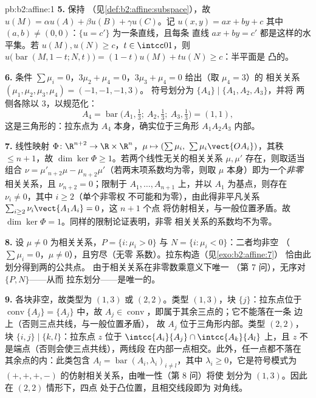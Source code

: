 \begin{solution}{pb:b2:affine:1}
\textbf{5.} 保持
（见\cref{def:b2:affine:subspace}），故 $u(M) = \alpha u(A) +
\beta u(B) + \gamma u(C)$。记 $u(x, y) = ax + by + c$
其中 $(a, b) \neq (0,0)$：$\{u = c'\}$ 为一条直线，且每条
直线 $ax + by = c'$ 都是这样的水平集。若 $u(M), u(N) \geq
c$，$t \in \intcc01$，则 $u\bigl(\operatorname{bar}(M,
1-t; N, t)\bigr) = (1-t)u(M) + tu(N) \geq c$：半平面是
凸的。

\textbf{6.} 条件 $\sum\mu_i = 0$，$3\mu_2 + \mu_4 =
0$，$3\mu_3 + \mu_4 = 0$ 给出（取 $\mu_4 = 3$）的
相关关系 $(\mu_1, \mu_2, \mu_3, \mu_4) = (-1, -1, -1, 3)$。
符号划分为 $\{A_4\} \mid \{A_1, A_2, A_3\}$，并将
两侧各除以 $3$，以规范化：
\[
A_4 = \operatorname{bar}\bigl(A_1, \tfrac13;\ A_2, \tfrac13;\
A_3, \tfrac13\bigr) = (1,1),
\]
这是三角形的：拉东点为 $A_4$
本身，确实位于三角形 $A_1A_2A_3$ 内部。

\textbf{7.} 线性映射 $\Phi \colon \R^{n+2} \to \R
\times \R^n$，$\mu \mapsto (\sum\mu_i,\
\sum\mu_i\vect{OA_i})$，其秩 $\leq n + 1$，故 $\dim\ker
\Phi \geq 1$。若两个线性无关的相关关系 $\mu, \mu'$
存在，则取适当组合 $\nu = \mu'_{n+2}\mu -
\mu_{n+2}\mu'$（若两末项系数均为零，则取
$\mu$ 本身）即为一个\emph{非零}相关关系，且 $\nu_{n+2}
= 0$；限制于 $A_1, \dots, A_{n+1}$ 上，并以
$A_1$ 为基点，则存在 $\nu_i \neq 0$，其中 $i \geq 2$（单个非零权
不可能和为零），由此得非平凡关系
$\sum_{i\geq2}\nu_i\vect{A_1A_i} = 0$，这 $n+1$ 个点
将仿射相关，与一般位置矛盾。故 $\dim\ker
\Phi = 1$。同样的限制论证表明，非零
相关关系的系数均不为零。

\textbf{8.} 设 $\mu \neq 0$ 为相关关系，$P = \{i :
\mu_i > 0\}$ 与 $N = \{i : \mu_i < 0\}$：二者均非空
（$\sum\mu_i = 0$，$\mu \neq 0$），且穷尽（无零
系数）。拉东构造（见\cref{exo:b2:affine:7}）
恰由此划分得到两的公共点。
由于相关关系在非零数乘意义下唯一
（第 7 问），无序对 $\{P, N\}$——从而
拉东划分——是唯一的。

\textbf{9.} 各块非空，故类型为 $(1,3)$ 或
$(2,2)$。类型 $(1,3)$，块 $\{j\}$：拉东点位于
$\operatorname{conv}\{A_j\} = \{A_j\}$ 中，故 $A_j \in
\operatorname{conv}$，即属于其余三点的；它不能落在一条
边上（否则三点共线，与一般位置矛盾），
故 $A_j$ 位于三角形内部。类型
$(2,2)$，块 $\{i,j\} \mid \{k,l\}$：拉东点 $z$
位于 $\intcc{A_i}{A_j} \cap \intcc{A_k}{A_l}$ 上，且 $z$
不是端点（否则会使三点共线），两线段
在内部一点相交。此外，任一点都不落在
其余点的内：此类包含 $A_l =
\operatorname{bar}(A_i, \lambda_i)_{i \neq l}$，其中
$\lambda_i \geq 0$，它是符号模式为
$(+,+,+,-)$ 的仿射相关关系，由唯一性（第 8 问）将使
划分为 $(1,3)$。因此在 $(2,2)$ 情形下，四点
处于凸位置，且相交线段即为
对角线。


\end{solution}
